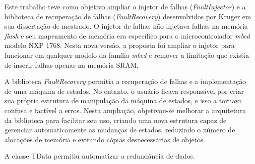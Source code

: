 Este trabalho teve como objetivo ampliar o injetor de falhas (\textit{FaultInjector}) e a biblioteca de recuperação de falhas (\textit{FaultRecovery}) desenvolvidos por Kruger \cite{Kruger:2014} em sua dissertação de mestrado. O injetor de falhas não injetava falhas na memória \textit{flash} e seu mapeamento de memória era específico para o microcontrolador \textit{mbed} modelo NXP 1768. Nesta nova versão, a proposta foi ampliar o injetor para funcionar em qualquer modelo da família \textit{mbed} e remover a limitação que existia de inserir falhas apenas na memória SRAM.

A biblioteca \textit{FaultRecovery} permitia a recuperação de falhas e a implementação de uma máquina de estados. No entanto, o usuário ficava responsável por criar sua própria estrutura de manipulação da máquina de estados, e isso a tornava confusa e factível a erros. Nesta ampliação, objetivou-se melhorar a arquitetura da biblioteca para facilitar seu uso, criando uma nova estrutura capaz de gerenciar automaticamente as mudanças de estados, reduzindo o número de alocações de memória e evitando cópias desnecessárias de objetos.

A classe TData permitiu automatizar a redundância de dados.



